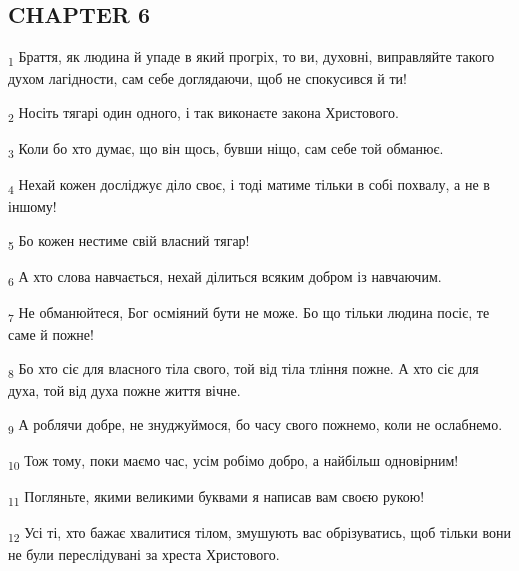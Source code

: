 \subsection{CHAPTER 6}
\begin{tcolorbox}
\textsubscript{1} Браття, як людина й упаде в який прогріх, то ви, духовні, виправляйте такого духом лагідности, сам себе доглядаючи, щоб не спокусився й ти!
\end{tcolorbox}
\begin{tcolorbox}
\textsubscript{2} Носіть тягарі один одного, і так виконаєте закона Христового.
\end{tcolorbox}
\begin{tcolorbox}
\textsubscript{3} Коли бо хто думає, що він щось, бувши ніщо, сам себе той обманює.
\end{tcolorbox}
\begin{tcolorbox}
\textsubscript{4} Нехай кожен досліджує діло своє, і тоді матиме тільки в собі похвалу, а не в іншому!
\end{tcolorbox}
\begin{tcolorbox}
\textsubscript{5} Бо кожен нестиме свій власний тягар!
\end{tcolorbox}
\begin{tcolorbox}
\textsubscript{6} А хто слова навчається, нехай ділиться всяким добром із навчаючим.
\end{tcolorbox}
\begin{tcolorbox}
\textsubscript{7} Не обманюйтеся, Бог осміяний бути не може. Бо що тільки людина посіє, те саме й пожне!
\end{tcolorbox}
\begin{tcolorbox}
\textsubscript{8} Бо хто сіє для власного тіла свого, той від тіла тління пожне. А хто сіє для духа, той від духа пожне життя вічне.
\end{tcolorbox}
\begin{tcolorbox}
\textsubscript{9} А роблячи добре, не знуджуймося, бо часу свого пожнемо, коли не ослабнемо.
\end{tcolorbox}
\begin{tcolorbox}
\textsubscript{10} Тож тому, поки маємо час, усім робімо добро, а найбільш одновірним!
\end{tcolorbox}
\begin{tcolorbox}
\textsubscript{11} Погляньте, якими великими буквами я написав вам своєю рукою!
\end{tcolorbox}
\begin{tcolorbox}
\textsubscript{12} Усі ті, хто бажає хвалитися тілом, змушують вас обрізуватись, щоб тільки вони не були переслідувані за хреста Христового.
\end{tcolorbox}
